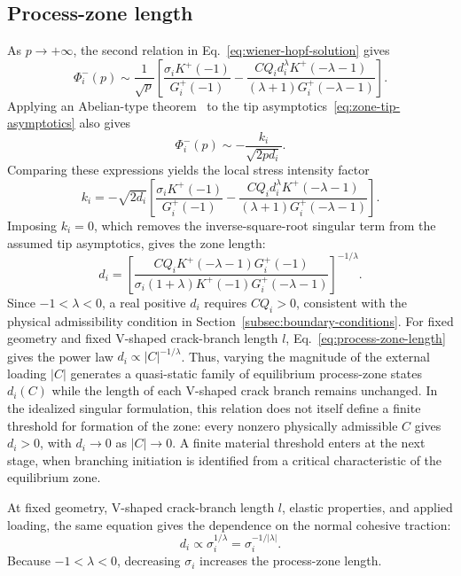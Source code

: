 \documentclass[pdflatex,onecolumn,sn-mathphys-ay]{sn-jnl}
\begin{document}
\subsection{Process-zone length}
\label{subsec:zone-length}

As $p\to+\infty$, the second relation in
Eq.~\eqref{eq:wiener-hopf-solution} gives
\begin{equation*}
  \Phi_i^-(p)\sim\frac{1}{\sqrt{p}}
  \left[
    \frac{\sigma_iK^+(-1)}{G_i^+(-1)}
    -\frac{CQ_i d_i^\lambda K^+(-\lambda-1)}
    {(\lambda+1)G_i^+(-\lambda-1)}
  \right].
\end{equation*}
Applying an Abelian-type theorem~\citep{noble1958wienerhopf} to the
tip asymptotics~\eqref{eq:zone-tip-asymptotics} also gives
\begin{equation*}
  \Phi_i^-(p)\sim-\frac{k_i}{\sqrt{2pd_i}}.
\end{equation*}
Comparing these expressions yields the local stress intensity factor
\begin{equation*}
  k_i=-\sqrt{2d_i}
  \left[
    \frac{\sigma_iK^+(-1)}{G_i^+(-1)}
    -\frac{CQ_i d_i^\lambda K^+(-\lambda-1)}
    {(\lambda+1)G_i^+(-\lambda-1)}
  \right].
\end{equation*}
Imposing $k_i=0$, which removes the inverse-square-root singular term
from the assumed tip asymptotics, gives the zone length:
\begin{equation}
\label{eq:process-zone-length}
  d_i=
  \left[
    \frac{CQ_iK^+(-\lambda-1)G_i^+(-1)}
    {\sigma_i(1+\lambda)K^+(-1)G_i^+(-\lambda-1)}
  \right]^{-1/\lambda}.
\end{equation}
Since $-1<\lambda<0$, a real positive $d_i$ requires $CQ_i>0$,
consistent with the physical admissibility condition in
Section~\ref{subsec:boundary-conditions}. For fixed geometry and fixed
V-shaped crack-branch length $l$, Eq.~\eqref{eq:process-zone-length}
gives the power law
$d_i\propto |C|^{-1/\lambda}$. Thus, varying the magnitude of the
external loading $|C|$ generates a quasi-static family of equilibrium
process-zone states $d_i(C)$ while the length of each V-shaped crack
branch remains unchanged. In the idealized singular formulation, this
relation does not itself define a finite threshold for formation of the
zone: every nonzero physically admissible $C$ gives $d_i>0$, with
$d_i\to0$ as $|C|\to0$. A finite material threshold enters at the next
stage, when branching initiation is identified from a critical
characteristic of the equilibrium zone.

At fixed geometry, V-shaped crack-branch length $l$, elastic properties,
and applied loading, the same equation gives the dependence on the normal cohesive
traction:
\begin{equation*}
  d_i\propto \sigma_i^{1/\lambda}
  =\sigma_i^{-1/|\lambda|}.
\end{equation*}
Because $-1<\lambda<0$, decreasing $\sigma_i$ increases the
process-zone length.
\end{document}
